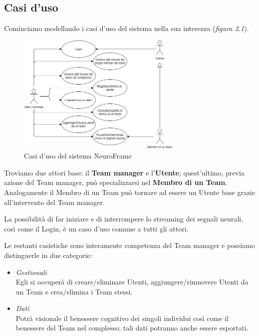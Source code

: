 \subsection{Casi d'uso}
Cominciamo modellando i casi d'uso del sistema nella sua interezza (\emph{figura 2.1}).
\begin{figure}[H]
  \centering
  \includegraphics[width=0.7\textwidth]{img/casi_uso.png}
  \caption{Casi d'uso del sistema NeuroFrame}
\end{figure}
\noindent Troviamo due attori base: il {\bf Team manager} e l'{\bf Utente}; quest'ultimo, previa azione del Team manager, può specializzarsi nel {\bf Membro di un Team}.\newline
Analogamente il Membro di un Team può tornare ad essere un Utente base grazie all'intervento del Team manager.\newline

\noindent La possibilità di far iniziare e di interrompere lo streaming dei segnali neurali, così come il Login, è un caso d'uso comune a tutti gli attori.\newline

\noindent Le restanti casistiche sono interamente competenza del Team manager e possiamo distinguerle in due categorie:
\begin{itemize}
  \item \emph{Gestionali}\\
  {Egli si occuperà di creare/eliminare Utenti, aggiungere/rimuovere Utenti da un Team e crea/elimina i Team stessi.}
  \item \emph{Dati}\\
  {Potrà visionale il benessere cognitivo dei singoli individui così come il benessere del Team nel complesso; tali dati potranno anche essere esportati.}
\end{itemize}
